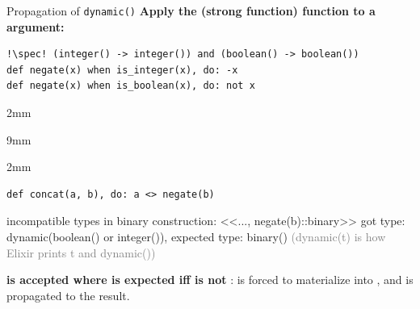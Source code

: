 \begin{frame}[fragile]{Propagation of \texttt{dynamic()}}
\textbf{\color{darkslateblue}Apply the (strong function)  function to a  argument: }
\vspace{-4mm}
\begin{block}{\vspace{-5mm}}
\begin{verbatim}
!\spec! (integer() -> integer()) and (boolean() -> boolean())
def negate(x) when is_integer(x), do: -x
def negate(x) when is_boolean(x), do: not x
\end{verbatim}
\vspace{-6.1mm}
\begin{overlayarea}{\textwidth}{2mm}
\end{overlayarea}
\hfill
\vspace{0.5mm}
\hfill
\end{block}
\pause\pause\vspace{-6mm}
\begin{block}{\vspace{-6mm}}\vspace{-2mm}
\begin{overlayarea}{\textwidth}{9mm}
\end{overlayarea}
\vspace{-6.5mm}
\begin{overlayarea}{\textwidth}{2mm}
\end{overlayarea}
\hfill
\vspace{0.5mm}
\end{block}
\pause\pause\pause\pause\pause\pause\vspace{-7mm}
\begin{block}{\vspace{-5mm}}
\begin{verbatim}
def concat(a, b), do: a <> negate(b)
\end{verbatim}
\vspace{-1mm}
\begin{warnverbatim}
\warn incompatible types in binary construction: <<..., negate(b)::binary>>
got type: dynamic(boolean() or integer()), expected type: binary()
\textcolor{gray}{(dynamic(t) is how Elixir prints t and dynamic())}
\end{warnverbatim}
\vspace{-1mm}
\end{block}
\pause
{\small\textbf{\color{darkslateblue} is accepted where  is expected iff  is not }:
 is forced to materialize into , and is propagated to the result.\par}
\end{frame}
